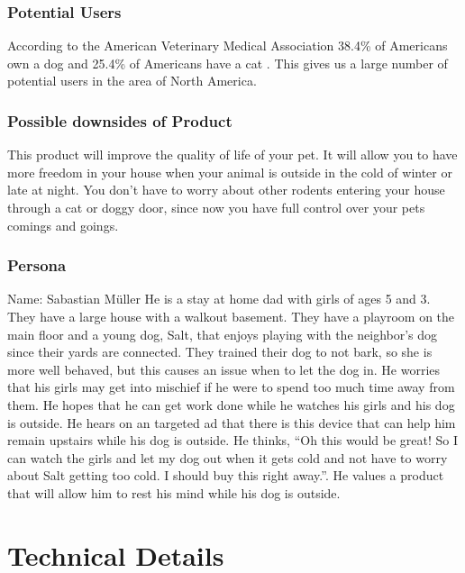 \documentclass[titlepage]{article}
\begin{document}
    \subsubsection{Potential Users}
    According to the American Veterinary Medical Association 38.4\% of
    Americans own a dog and 25.4\% of Americans have a cat
    \cite{pet_owner}. This gives us a large number of potential users in
    the area of North America.
    \subsubsection{Possible downsides of Product}
    This product will improve the quality of life of your pet. It will
    allow you to have more freedom in your house when your animal is
    outside in the cold of winter or late at night.
    You don’t have to worry about other rodents entering your house
    through a cat or doggy door, since now you have full control over
    your pets comings and goings.
    \subsubsection{Persona}
    Name: Sabastian Müller
    He is a stay at home dad with girls of ages 5 and 3. They have a
    large house with a walkout basement. They have a playroom on the
    main floor and a young dog, Salt, that enjoys playing with the
    neighbor's dog since their yards are connected. They trained their
    dog to not bark, so she is more well behaved, but this causes an
    issue when to let the dog in.
    He worries that his girls may get into mischief if he were to spend
    too much time away from them. He hopes that he can get work done
    while he watches his girls and his dog is outside.
    He hears on an targeted ad that there is this device that can help
    him remain upstairs while his dog is outside. He thinks, “Oh this
    would be great! So I can watch the girls and let my dog out when it
    gets cold and not have to worry about Salt getting too cold. I
    should buy this right away.”.
    He values a product that will allow him to rest his mind while his
    dog is outside.



    \pagebreak
    \section{Technical Details}
\end{document}
